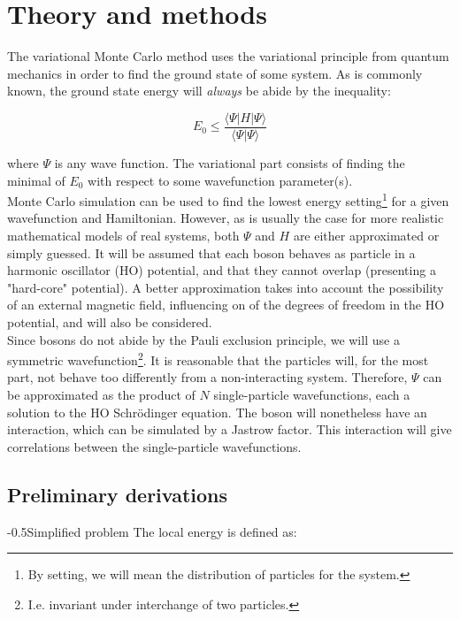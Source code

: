\documentclass[english, a4paper]{article}
\makeatletter
\renewcommand{\subsubsection}{\@startsection{subsubsection}{3}{0pt}%
{-\baselineskip}{0.5\baselineskip}{\bf\large}}
\makeatother
\begin{document}
\section{Theory and methods}

The variational Monte Carlo method uses the variational principle from quantum mechanics in order to find the ground state of some system. As is commonly known, the ground state energy will \emph{always} be abide by the inequality:

\begin{equation}
	E_{0} \leq \frac{\langle \Psi|H|\Psi\rangle}{\langle\Psi|\Psi\rangle}
\end{equation}

where $\Psi$ is any wave function. The variational part consists of finding the minimal of $E_0$ with respect to some wavefunction parameter(s).\\
Monte Carlo simulation can be used to find the lowest energy setting\footnote{By setting, we will mean the distribution of particles for the system.} for a given wavefunction and Hamiltonian. However, as is usually the case for more realistic mathematical models of real systems, both $\Psi$ and $H$ are either approximated or simply guessed. It will be assumed that each boson behaves as particle in a harmonic oscillator (HO) potential, and that they cannot overlap (presenting a "hard-core" potential). A better approximation takes into account the possibility of an external magnetic field, influencing on of the degrees of freedom in the HO potential, and will also be considered.\\ 
Since bosons do not abide by the Pauli exclusion principle, we will use a symmetric wavefunction\footnote{I.e. invariant under interchange of two particles.}. It is reasonable that the particles will, for the most part, not behave too differently from a non-interacting system. Therefore, $\Psi$ can be approximated as the product of $N$ single-particle wavefunctions, each a solution to the HO Schr\"odinger equation. The boson will nonetheless have an interaction, which can be simulated by a Jastrow factor. This interaction will give correlations between the single-particle wavefunctions.

\subsection{Preliminary derivations}

\subsubsection{Simplified problem}
The local energy is defined as:
\end{document}
